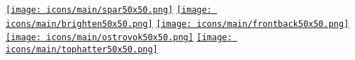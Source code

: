 \documentclass[]{plushcv}
\begin{document}
\begin{minipage}[t]{0.70\textwidth}
\href{https://getspar.com}{\texttt{[image: icons/main/spar50x50.png]}}\hspace{0.3cm}
\href{https://www.nytimes.com/2016/12/20/fashion/austin-kevitch-brighten-app-anti-bullying.html}{\texttt{[image: icons/main/brighten50x50.png]}}\hspace{0.3cm}
\href{https://www.businessinsider.com/frontback-the-once-hot-startup-that-rejected-a-40-million-twitter-acquisition-is-back-from-the-dead-2015-7}{\texttt{[image: icons/main/frontback50x50.png]}}\hspace{0.3cm}
\href{https://apps.apple.com/us/app/ostrovok-ru-hotel-deals/id564204730}{\texttt{[image: icons/main/ostrovok50x50.png]}}\hspace{0.3cm}
\href{https://tophatter.com}{\texttt{[image: icons/main/tophatter50x50.png]}}



\end{minipage} 
\hfill
\end{document}
